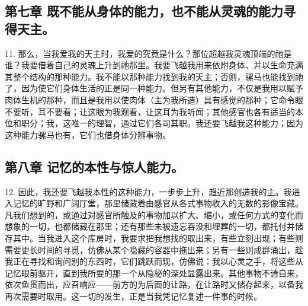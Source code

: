 
\subsection{第七章 既不能从身体的能力，也不能从灵魂的能力寻得天主。}

11. 那么，当我爱我的天主时，我爱的究竟是什么？那位超越我灵魂顶端的祂是谁？我要借着自己的灵魂上升到祂那里。我要飞越我用来依附身体、并以生命充满其整个结构的那种能力。我不能以那种能力找到我的天主；否则，骡马也能找到祂了，因为使它们身体生活的正是同一种能力。但另有其他能力，不仅是我用以赋予肉体生机的那种，而且是我用以使肉体（主为我所造）具有感觉的那种；它命令眼不要听，耳不要看；让这眼为我观看，让这耳为我听闻；其他感官也各有适当的本位和职分；我，这唯一的理智，通过它们各司其职。我还要飞越我这种能力；因为这种能力骡马也有，它们也借身体分辨事物。\par


\subsection{第八章 记忆的本性与惊人能力。}

12. 因此，我还要飞越我本性的这种能力，一步步上升，趋近那创造我的主。我进入记忆的旷野和广阔厅堂，那里储藏着由感官从各式事物收入的无数的影像宝藏。凡我们想到的，或通过对感官所触及的事物加以扩大、缩小，或任何方式的变化而想象的一切，也都储藏在那里；还有那些未被遗忘吞没和埋葬的一切，都托付并储存其中。当我进入这个库房时，我要求把我想找的取出来，有些立刻出现；有些则需要更长时间的寻觅，仿佛从某个隐藏的容器中拖出来；另有一些则成群涌出，趁我正在寻找和询问别的东西时，它们跳跃而现，仿佛说：我以心灵之手，将这些从记忆眼前驱开，直到我所要的那一个从隐秘的深处显露出来。其他事物不请自来，依次鱼贯而出，应召响应——前方的为后面的让路，在让路时又储存起来，以备我再次需要时取用。这一切的发生，正是当我凭记忆复述一件事的时候。\par

